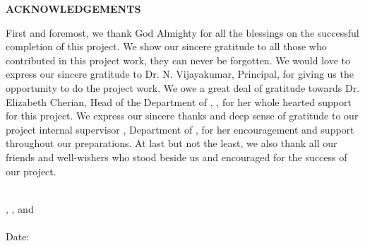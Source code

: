 \thispagestyle{plain}

\begin{center}
 \Large {\bf \uppercase{Acknowledgements}}
\end{center}

\vspace{3\baselineskip}
\begin{flushleft}
%
%
%

First and foremost, we thank God Almighty for all the blessings on the successful
completion of this project. We show our sincere gratitude to all those who contributed in this
project work, they can never be forgotten.
We would love to express our sincere gratitude to 
Dr. N. Vijayakumar, Principal,
\University for giving us the opportunity to do the project
work. We owe a great deal of gratitude towards Dr. Elizabeth Cherian, Head of the Department of \Department, \University, for her whole
hearted support for this project. We express our sincere thanks and deep sense of gratitude
to our project internal supervisor \Supervisor, Department of \Department, for her encouragement and support throughout our preparations.
At last but not the least, we also thank all our friends and well-wishers who stood
beside us and encouraged for the success of our project.
\end{flushleft}

\noindent
\vspace{\baselineskip} \\
\textbf{\firstAuthor}, \textbf{\secondAuthor}, \textbf{\thirdAuthor} and \textbf{\fourthAuthor}\\
\University \\
Date: \reportSubmissionDate